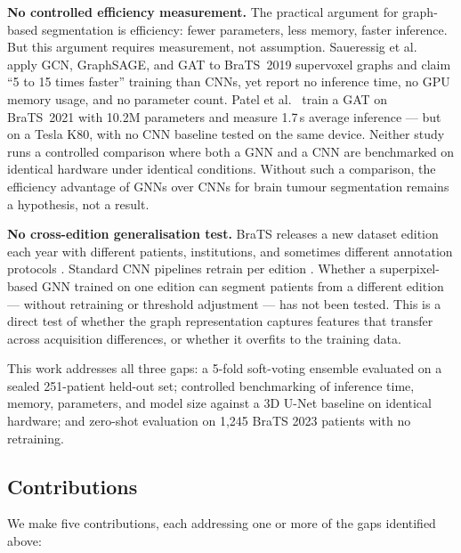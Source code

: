 \documentclass{article}
\begin{document}
\textbf{No controlled efficiency measurement.} The practical argument
for graph-based segmentation is efficiency: fewer parameters, less
memory, faster inference. But this argument requires measurement, not
assumption. Saueressig et al.\ \cite{saueressig2021exploring} apply
GCN, GraphSAGE, and GAT to BraTS~2019 supervoxel graphs and claim
``5 to 15 times faster'' training than CNNs, yet report no inference
time, no GPU memory usage, and no parameter count. Patel et
al.\ \cite{patel2023multiclass} train a GAT on BraTS~2021 with 10.2M
parameters and measure 1.7\,s average inference --- but on a Tesla K80,
with no CNN baseline tested on the same device. Neither study runs a
controlled comparison where both a GNN and a CNN are benchmarked on
identical hardware under identical conditions. Without such a
comparison, the efficiency advantage of GNNs over CNNs for brain tumour
segmentation remains a hypothesis, not a result.

\textbf{No cross-edition generalisation test.} BraTS releases a new
dataset edition each year with different patients, institutions, and
sometimes different annotation protocols \cite{menze2015multimodal,
bakas2021brats}. Standard CNN pipelines retrain per edition
\cite{isensee2021nnunet}. Whether a superpixel-based GNN trained on one
edition can segment patients from a different edition --- without
retraining or threshold adjustment --- has not been tested. This is a
direct test of whether the graph representation captures features that
transfer across acquisition differences, or whether it overfits to the
training data.

This work addresses all three gaps: a 5-fold soft-voting ensemble
evaluated on a sealed 251-patient held-out set; controlled benchmarking
of inference time, memory, parameters, and model size against a 3D U-Net
\cite{cicek20163d} baseline on identical hardware; and zero-shot
evaluation on 1,245 BraTS 2023 patients with no retraining.

\subsection{Contributions}
\label{sec:contributions}

We make five contributions, each addressing one or more of the gaps identified
above:
\end{document}
